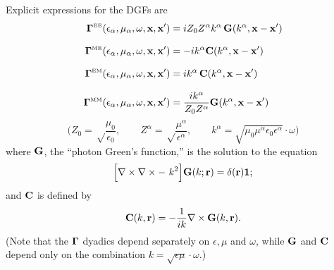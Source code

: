 \documentclass[dvips,letterpaper]{article}
\begin{document}
Explicit expressions for the DGFs are 
\begin{align*}
\boldsymbol{\Gamma}^{\hbox{\tiny{EE}}}(\epsilon_\alpha, \mu_\alpha, \omega, \mathbf{x}, \mathbf{x}^\prime)
&=
 iZ_0 Z^\alpha k^\alpha \, \mathbf{G}(k^\alpha, \mathbf{x}-\mathbf{x}^\prime)
\\[8pt]
\boldsymbol{\Gamma}^{\hbox{\tiny{ME}}}(\epsilon_\alpha, \mu_\alpha, \omega, \mathbf{x}, \mathbf{x}^\prime)
&=
 -ik^\alpha \mathbf{C}(k^\alpha, \mathbf{x}-\mathbf{x}^\prime)
\\[8pt]
\boldsymbol{\Gamma}^{\hbox{\tiny{EM}}}(\epsilon_\alpha, \mu_\alpha, \omega, \mathbf{x}, \mathbf{x}^\prime)
&=
 ik^\alpha \, \mathbf{C}(k^\alpha, \mathbf{x}-\mathbf{x}^\prime)
\\[8pt]
\boldsymbol{\Gamma}^{\hbox{\tiny{MM}}}(\epsilon_\alpha, \mu_\alpha, \omega, \mathbf{x}, \mathbf{x}^\prime)
&= \frac{ik^\alpha}{Z_0 Z^\alpha} \mathbf{G}(k^\alpha, \mathbf{x}-\mathbf{x}^\prime)
\end{align*}
$$\bigg(Z_0=\sqrt\frac{\mu_0}{\epsilon_0},
        \qquad
        Z^\alpha=\sqrt\frac{\mu^\alpha}{\epsilon^\alpha}, 
         \qquad
        k^\alpha=\sqrt{\mu_0 \mu^\alpha \epsilon_0 \epsilon^\alpha}\cdot \omega
  \bigg)
$$
where $\mathbf{G}$, the ``photon Green's function,''
is the solution to the equation
\begin{equation}
 \Big[\nabla \times \nabla\times - \,\,k^2 \Big]\mathbf{G}(k; \mathbf{r})
 =\delta(\mathbf{r})\mathbf{1};
 \label{DyadicGFG}
\end{equation}
and $\mathbf{C}$ is defined by  
\begin{equation}
  \mathbf{C}(k, \mathbf{r}) = -\frac{1}{ik} \nabla \times \mathbf{G}(k, \mathbf{r}).
 \label{DyadicGFC}
\end{equation}
%
(Note that the $\boldsymbol{\Gamma}$ dyadics depend separately on $\epsilon,\mu$ 
and $\omega$, while $\mathbf{G}$ and $\mathbf{C}$ depend only on the 
combination $k=\sqrt{\epsilon\mu}\cdot \omega.$)
\end{document}
